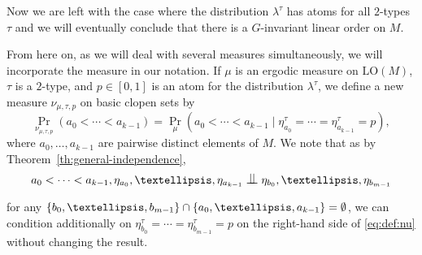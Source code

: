\documentclass[11pt]{article}
\theoremstyle{plain}
\theoremstyle{definition}
\DeclarePairedDelimiter\set{\{}{\}}
\newcommand{\LO}{\mathrm{LO}}
\newcommand{\indep}[1][]{%
  \mathrel{
    \mathop{
      \scalebox{1}[1.3]{\text{$\perp\!\!\!\perp$}}
    }\displaylimits_{#1}
  }
}
\begin{document}
Now we are left with the case where the distribution $\lambda^\tau$ has atoms for all $2$-types~$\tau$ and we will eventually conclude that there is a $G$-invariant linear order on $M$.

From here on, as we will deal with several measures simultaneously, we will incorporate the measure in our notation. If $\mu$ is an ergodic measure on $\LO(M)$, $\tau$ is a $2$-type, and $p \in [0, 1]$ is an atom for the distribution $\lambda^\tau$, we define a new measure $\nu_{\mu, \tau, p}$ on basic clopen sets by
\begin{equation}
\label{eq:def:nu}
\Pr_{\nu_{\mu, \tau, p}}(a_0 < \cdots < a_{k-1}) = \Pr_\mu(a_0 < \cdots < a_{k-1} \mid \eta_{a_0}^\tau = \cdots = \eta_{a_{k-1}}^\tau = p),
\end{equation}
where $a_0, \ldots, a_{k-1}$ are pairwise distinct elements of $M$. We note that as by Theorem~\ref{th:general-independence},
\begin{equation*}
a_0 < \cdots < a_{k-1}, \eta_{a_0}, \ldots, \eta_{a_{k-1}} \indep \eta_{b_0}, \ldots, \eta_{b_{m-1}}
\end{equation*}
for any $\set{b_0, \ldots, b_{m-1}} \cap \set{a_0, \ldots, a_{k-1}} = \emptyset$, we can condition additionally on $\eta_{b_0}^\tau = \cdots = \eta_{b_{m-1}}^\tau = p$ on the right-hand side of \eqref{eq:def:nu} without changing the result.
\end{document}
